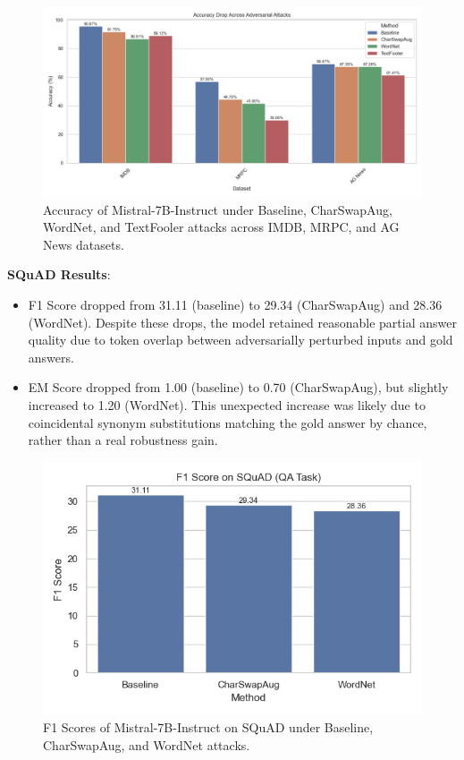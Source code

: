 \documentclass[conference]{IEEEtran}
\begin{document}
\begin{figure}[htbp]
    \centering
    \includegraphics[width=0.9\linewidth]{figures/accuracy_chart_updated.png}
    \caption{Accuracy of Mistral-7B-Instruct under Baseline, CharSwapAug, WordNet, and TextFooler attacks across IMDB, MRPC, and AG News datasets.}
    \label{fig:accuracy}
\end{figure}

\textbf{SQuAD Results}:
\begin{itemize}
    \item F1 Score dropped from 31.11 (baseline) to 29.34 (CharSwapAug) and 28.36 (WordNet). Despite these drops, the model retained reasonable partial answer quality due to token overlap between adversarially perturbed inputs and gold answers.
    \item EM Score dropped from 1.00 (baseline) to 0.70 (CharSwapAug), but slightly increased to 1.20 (WordNet). This unexpected increase was likely due to coincidental synonym substitutions matching the gold answer by chance, rather than a real robustness gain.
\end{itemize}


\begin{figure}[htbp]
    \centering
    \includegraphics[width=0.65\linewidth]{figures/f1_chart_updated.png}
    \caption{F1 Scores of Mistral-7B-Instruct on SQuAD under Baseline, CharSwapAug, and WordNet attacks.}
    \label{fig:f1}
\end{figure}
\end{document}
